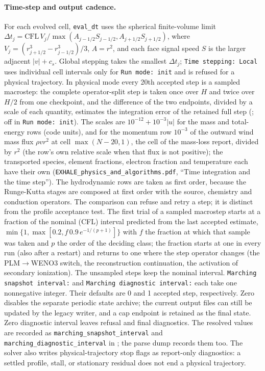 \documentclass[english,a4paper]{my_memo}
\begin{document}
\paragraph{Time-step and output cadence.}
For each evolved cell, \texttt{eval\_dt} uses the spherical finite-volume
limit $\Delta t_j=\mathrm{CFL}\,V_j/
\max(A_{j-1/2}S_{j-1/2},A_{j+1/2}S_{j+1/2})$, where
$V_j=(r_{j+1/2}^3-r_{j-1/2}^3)/3$, $A=r^2$, and each face signal speed
$S$ is the larger adjacent $|v|+c_s$. Global stepping takes the smallest
$\Delta t_j$; \texttt{Time stepping: Local} uses individual cell intervals
only for \texttt{Run mode: init} and is refused for a physical trajectory.
In physical mode every 20th accepted step is a sampled macrostep: the
complete operator-split step is taken once over $H$ and twice over $H/2$ from
one checkpoint, and the difference of the two endpoints, divided by a scale
of each quantity, estimates the integration error of the retained full step
(; off in \texttt{Run mode: init}). The scales are
$10^{-12}+10^{-3}|u|$ for the mass and total-energy rows (code units), and for
the momentum row $10^{-3}$ of the outward wind mass flux
$\rho v r^2$ at cell $\max(N-20,1)$, the cell of the mass-loss report,
divided by $r^2$ (the row's own relative scale when that flux is not
positive); the transported species, element fractions, electron fraction and
temperature each have their own (\texttt{EXHALE\_physics\_and\_algorithms.pdf},
``Time integration and the time step''). The hydrodynamic rows are taken as
first order, because the Runge-Kutta stages are composed at first order with
the source, chemistry and conduction operators. The comparison can refuse and
retry a step; it is distinct from the profile acceptance test. The first
trial of a sampled macrostep starts at a fraction of the nominal (CFL)
interval predicted from the last accepted estimate,
$\min\{1,\max[0.2, f\,0.9\,e^{-1/(p+1)}]\}$ with $f$ the fraction at which
that sample was taken and $p$ the order of the deciding class; the fraction
starts at one in every run (also after a restart) and returns to one where
the step operator changes (the PLM$\to$WENO3 switch, the reconstruction
continuation, the activation of secondary ionization). The unsampled steps
keep the nominal interval.
\texttt{Marching snapshot interval:} and
\texttt{Marching diagnostic interval:} each take one nonnegative integer.
Their defaults are 0 and 1 accepted step, respectively. Zero disables the separate periodic state archive; the current output
files can still be updated by the legacy writer, and a cap endpoint is
retained as the final state. Zero diagnostic interval leaves refusal and final diagnostics.
The resolved values are recorded as \texttt{marching\_snapshot\_interval}
and \texttt{marching\_diagnostic\_interval} in
; the parse dump records them too.
The solver also writes physical-trajectory stop flags as report-only
diagnostics: a settled profile, stall, or stationary residual does not end
a physical trajectory.
\end{document}

